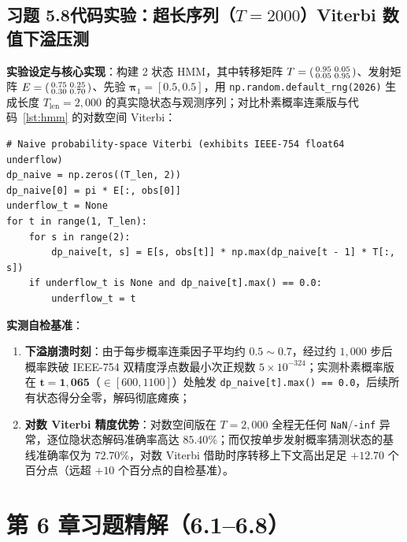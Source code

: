 \subsection*{习题 5.8\quad 代码实验：超长序列（$T=2000$）Viterbi 数值下溢压测}
\textbf{实验设定与核心实现}：构建 2 状态 HMM，其中转移矩阵 $T = \begin{psmallmatrix}0.95 & 0.05\\ 0.05 & 0.95\end{psmallmatrix}$、发射矩阵 $E = \begin{psmallmatrix}0.75 & 0.25\\ 0.30 & 0.70\end{psmallmatrix}$、先验 $\boldsymbol{\pi}_1 = [0.5, 0.5]$，用 \texttt{np.random.\allowbreak default\_rng(2026)} 生成长度 $T_{\text{len}} = 2{,}000$ 的真实隐状态与观测序列；对比朴素概率连乘版与代码~\ref{lst:hmm} 的对数空间 Viterbi：
\begin{lstlisting}
# Naive probability-space Viterbi (exhibits IEEE-754 float64 underflow)
dp_naive = np.zeros((T_len, 2))
dp_naive[0] = pi * E[:, obs[0]]
underflow_t = None
for t in range(1, T_len):
    for s in range(2):
        dp_naive[t, s] = E[s, obs[t]] * np.max(dp_naive[t - 1] * T[:, s])
    if underflow_t is None and dp_naive[t].max() == 0.0:
        underflow_t = t
\end{lstlisting}
\textbf{实测自检基准}：
\begin{enumerate}[label=(\arabic*), leftmargin=1.8em]
  \item \textbf{下溢崩溃时刻}：由于每步概率连乘因子平均约 $0.5 \sim 0.7$，经过约 $1{,}000$ 步后概率跌破 IEEE-754 双精度浮点数最小次正规数 $5\times 10^{-324}$；实测朴素概率版在 $\mathbf{t = 1{,}065}$（$\in [600, 1100]$）处触发 \texttt{dp\_naive[t].max() == 0.0}，后续所有状态得分全零，解码彻底瘫痪；
  \item \textbf{对数 Viterbi 精度优势}：对数空间版在 $T=2{,}000$ 全程无任何 \texttt{NaN}/\texttt{-inf} 异常，逐位隐状态解码准确率高达 $\mathbf{85.40\%}$；而仅按单步发射概率猜测状态的基线准确率仅为 $\mathbf{72.70\%}$，对数 Viterbi 借助时序转移上下文高出足足 $\mathbf{+12.70}$ 个百分点（远超 $+10$ 个百分点的自检基准）。
\end{enumerate}

\section{第 6 章习题精解（6.1--6.8）}

